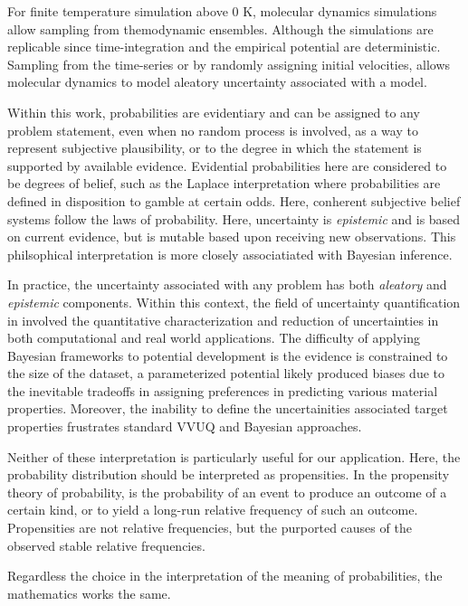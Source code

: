 For finite temperature simulation above $0$ K, molecular dynamics simulations allow sampling from themodynamic ensembles.  Although the simulations are replicable since time-integration and the empirical potential are deterministic.  Sampling from the time-series or by randomly assigning initial velocities, allows molecular dynamics to model aleatory uncertainty associated with a model.

Within this work, probabilities are evidentiary and can be assigned to any problem statement, even when no random process is involved, as a way to represent subjective plausibility, or to the degree in which the statement is supported by available evidence.  Evidential probabilities here are considered to be degrees of belief, such as the Laplace interpretation where probabilities are defined in disposition to gamble at certain odds\cite{laplace}.  Here, conherent subjective belief systems follow the laws of probability\cite{ramsey_probability,definetti_probability}.  Here, uncertainty is \emph{epistemic} and is based on current evidence, but is mutable based upon receiving new observations\cite{ramsey2016truth,definetti1980_foresight,jaynes2003_probability}.  This philsophical interpretation is more closely associatiated with Bayesian inference.

In practice, the uncertainty associated with any problem has both \emph{aleatory} and \emph{epistemic} components.  Within this context, the field of uncertainty quantification\cite{oberkamph} in involved the quantitative characterization and reduction of uncertainties in both computational and real world applications.  The difficulty of applying Bayesian frameworks to potential development is the evidence is constrained to the size of the dataset, a parameterized potential likely produced biases due to the inevitable tradeoffs in assigning preferences in predicting various material properties.  Moreover, the inability to define the uncertainities associated target properties frustrates standard VVUQ and Bayesian approaches.

 Neither of these interpretation is particularly useful for our application.  Here, the probability distribution should be interpreted as propensities.  In the propensity theory of probability, is the probability of an event to produce an outcome of a certain kind, or to yield a long-run relative frequency of such an outcome.  Propensities are not relative frequencies, but the purported causes of the observed stable relative frequencies.

Regardless the choice in the interpretation of the meaning of probabilities, the mathematics works the same.

